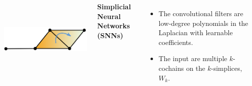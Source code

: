 \documentclass[landscape,a0paper,blockverticalspace = 5mm]{tikzposter}
\begin{document}
\begin{columns}
{{\begin{center}
\begin{minipage}{0.2\linewidth}
\begin{center}
          \vspace{1cm}
        
          \end{center}
      \end{minipage} \hspace{3.5cm}
	\begin{minipage}{0.2\linewidth}
	\begin{center}
          \includegraphics[height=4cm]{figures/glap2.png}
          
        
          \end{center}
      \end{minipage} 
      \end{center}



 \begin{center} 
\vspace{-1.5cm}
\Large{\textbf{Simplicial Neural Networks (SNNs)}}
\end{center}
\vspace{-0.5cm}
\begin{itemize}
\item The convolutional filters are low-degree polynomials in the Laplacian with learnable coefficients.
\item The input are multiple $k$-cochains on the $k$-simplices, $W_k$.
\end{itemize}
 

}}
\end{columns}
\end{document}
